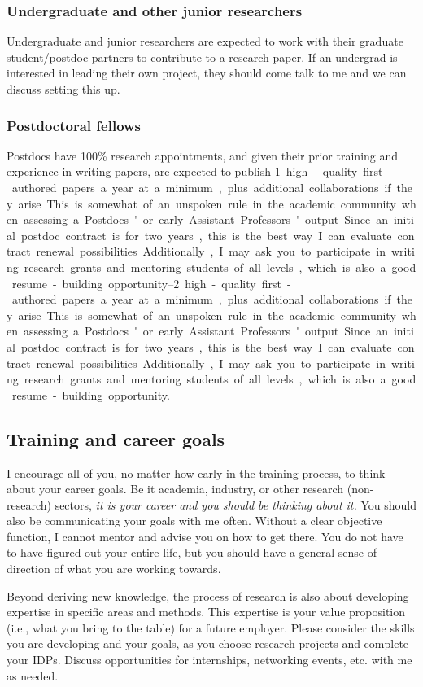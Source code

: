 \documentclass[12pt]{article}
\begin{document}
\subsubsection{Undergraduate and other junior researchers}
Undergraduate and junior researchers are expected to work with their graduate student/postdoc partners to contribute to a research paper.
If an undergrad is interested in leading their own project, they should come talk to me and we can discuss setting this up.

\subsubsection{Postdoctoral fellows}
Postdocs have 100\% research appointments, and given their prior training and experience in writing papers, are expected to publish \qtyrange{1}{2} high-quality first-authored papers a year at a minimum, plus additional collaborations if they arise.
This is somewhat of an unspoken rule in the academic community when assessing a Postdocs' or early Assistant Professors' output.
Since an initial postdoc contract is for two years, this is the best way I can evaluate contract renewal possibilities.
Additionally, I may ask you to participate in writing research grants and mentoring students of all levels, which is also a good resume-building opportunity.

\subsection{Training and career goals}

I encourage all of you, no matter how early in the training process, to think about your career goals.
Be it academia, industry, or other research (non-research) sectors, \emph{it is your career and you should be thinking about it.
}
You should also be communicating your goals with me often.
Without a clear objective function, I cannot mentor and advise you on how to get there.
You do not have to have figured out your entire life, but you should have a general sense of direction of what you are working towards.

Beyond deriving new knowledge, the process of research is also about developing expertise in specific areas and methods.
This expertise is your value proposition (i.e., what you bring to the table) for a future employer.
Please consider the skills you are developing and your goals, as you choose research projects and complete your \glspl{IDP}.
Discuss opportunities for internships, networking events, etc. with me as needed.
\end{document}
